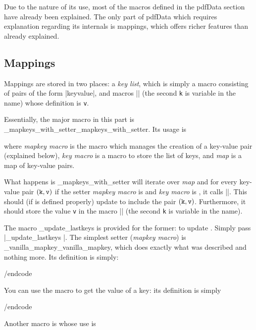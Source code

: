 Due to the nature of its use, most of the macros defined in the pdfData section have already been explained.
The only part of pdfData which requires explanation regarding its internals is mappings, which offers richer features than already explained.

\subsection{Mappings}

Mappings are stored in two places: a {\it key list}, which is simply a macro consisting of pairs of the form \inlinecode|{key}{value}|, and macros \inlinecode|\key@k| (the second {\tt k} is variable in the name) whose definition
is {\tt v}.

Essentially, the major macro in this part is \macro\_mapkeys_with_setter\anchormacro\_mapkeys_with_setter.
Its usage is

where {\it mapkey macro} is the macro which manages the creation of a key-value pair (explained below), {\it key macro} is a macro to store
the list of keys, and {\it map} is a map of key-value pairs.

What happens is \macro\_mapkeys_with_setter{} will iterate over {\it map} and for every key-value pair $({\tt k,v})$ if the setter {\it mapkey macro} is \macro\M{} and {\it key macro} is \macro\K{}, it calls
\inlinecode|\M {}|.
This should (if \macro\M{} is defined properly) update \macro\K{} to include the pair $({\tt k,v})$.
Furthermore, it should store the value {\tt v} in the macro \inlinecode|\key@k| (the second {\tt k} is variable in the name).

The macro \macro\_update_lastkeys{} is provided for the former: to update \macro\K{}.
Simply pass \inlinecode|\_update_lastkeys |.
The simplest setter ({\it mapkey macro}) is \macro\_vanilla_mapkey\anchormacro\_vanilla_mapkey, which does exactly what was described and nothing more.
Its definition is simply:

\begincode
\def\_vanilla_mapkey#1#2#3{%
    \_xp\def\csname key@\_id#2\endcsname{#3}%
    \_update_lastkeys{#1}{#2}{#3}%
}
/endcode

You can use the macro \macro\getvalue\anchormacro\getvalue{} to get the value of a key: its definition is simply

\begincode
\def\getvalue#1{%
    \csname key@#1\endcsname%
}
/endcode

Another macro is \macro\keyexists{} whose use is

